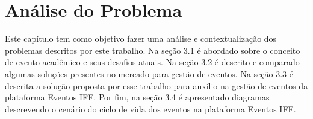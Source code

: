 \chapter{Análise do Problema}

Este capítulo tem como objetivo fazer uma análise e contextualização dos problemas descritos por este trabalho. Na seção 3.1 é abordado sobre o conceito de evento acadêmico e seus desafios atuais. Na seção 3.2 é descrito e comparado algumas soluções presentes no mercado para gestão de eventos. Na seção 3.3 é descrita a solução proposta por esse trabalho para auxílio na gestão de eventos da plataforma Eventos IFF. Por fim, na seção 3.4 é apresentado diagramas descrevendo o cenário do ciclo de vida dos eventos na plataforma Eventos IFF.



